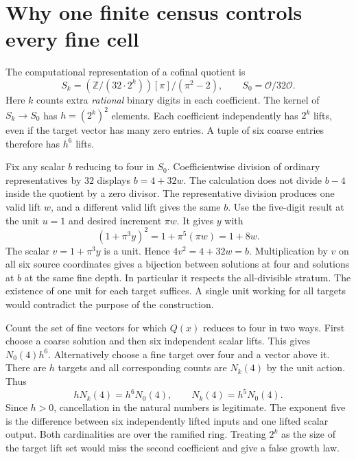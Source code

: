 \documentclass[12pt,letterpaper]{article}
\begin{document}
\section{Why one finite census controls every fine cell}
The computational representation of a cofinal quotient is
\[
 S_k=(\mathbb Z/(32\cdot2^k)) [\pi]/(\pi^2-2),\qquad S_0=\mathcal O/32\mathcal O.
\]
Here $k$ counts extra \emph{rational} binary digits in each coefficient. The kernel of $S_k\to S_0$ has $h=(2^k)^2$ elements. Each coefficient independently has $2^k$ lifts, even if the target vector has many zero entries. A tuple of six coarse entries therefore has $h^6$ lifts.
\par
Fix any scalar $b$ reducing to four in $S_0$. Coefficientwise division of ordinary representatives by $32$ displays $b=4+32w$. The calculation does not divide $b-4$ inside the quotient by a zero divisor. The representative division produces one valid lift $w$, and a different valid lift gives the same $b$. Use the five-digit result at the unit $u=1$ and desired increment $\pi w$. It gives $y$ with
\[
 (1+\pi^3y)^2=1+\pi^5(\pi w)=1+8w.
\]
The scalar $v=1+\pi^3y$ is a unit. Hence $4v^2=4+32w=b$. Multiplication by $v$ on all six source coordinates gives a bijection between solutions at four and solutions at $b$ at the same fine depth. In particular it respects the all-divisible stratum. The existence of one unit for each target suffices. A single unit working for all targets would contradict the purpose of the construction.
\par
Count the set of fine vectors for which $Q(x)$ reduces to four in two ways. First choose a coarse solution and then six independent scalar lifts. This gives $N_0(4)h^6$. Alternatively choose a fine target over four and a vector above it. There are $h$ targets and all corresponding counts are $N_k(4)$ by the unit action. Thus
\[
         hN_k(4)=h^6N_0(4),\qquad N_k(4)=h^5 N_0(4).
\]
Since $h>0$, cancellation in the natural numbers is legitimate. The exponent five is the difference between six independently lifted inputs and one lifted scalar output. Both cardinalities are over the ramified ring. Treating $2^k$ as the size of the target lift set would miss the second coefficient and give a false growth law.
\end{document}
